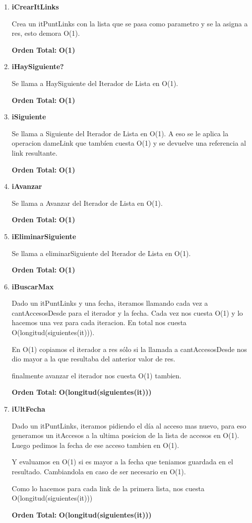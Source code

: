 \vspace*{1em}
\begin{enumerate}

\item\textbf{iCrearItLinks}
\par Crea un itPuntLinks con la lista que se pasa como parametro y se la asigna a res, esto demora O(1).
\par \textbf{Orden Total:} \textbf{O(1)}

\item\textbf{iHaySiguiente?}
\par Se llama a HaySiguiente del Iterador de Lista en O(1).
\par \textbf{Orden Total:} \textbf{O(1)}

\item\textbf{iSiguiente}
\par Se llama a Siguiente del Iterador de Lista en O(1). A eso se le aplica la operacion dameLink que tambíen cuesta O(1) y se devuelve una referencia al link resultante.
\par \textbf{Orden Total:} \textbf{O(1)}

\item\textbf{iAvanzar}
\par Se llama a Avanzar del Iterador de Lista en O(1).
\par \textbf{Orden Total:} \textbf{O(1)}

\item\textbf{iEliminarSiguiente}
\par Se llama a eliminarSiguiente del Iterador de Lista en O(1).
\par \textbf{Orden Total:} \textbf{O(1)}

\item\textbf{iBuscarMax}
\par Dado un itPuntLinks y una fecha, iteramos llamando cada vez a cantAccesosDesde para el iterador y la fecha. Cada vez nos cuesta O(1) y lo hacemos una vez para cada iteracion. En total nos cuesta O(longitud(siguientes(it))).
\par En O(1) copiamos el iterador a res sólo si la llamada a cantAccesosDesde nos dio mayor a la que resultaba del anterior valor de res.
\par finalmente avanzar el iterador nos cuesta O(1) tambien.
\par \textbf{Orden Total:} \textbf{O(longitud(siguientes(it)))}

\item\textbf{iUltFecha}
\par Dado un itPuntLinks, iteramos pidiendo el día al acceso mas nuevo, para eso generamos un itAccesos a la ultima posicion de la lista de accesos en O(1). Luego pedimos la fecha de ese acceso tambien en O(1).
\par Y evaluamos en O(1) si es mayor a la fecha que teniamos guardada en el resultado. Cambiandola en caso de ser necesario en O(1).
\par Como lo hacemos para cada link de la primera lista, nos cuesta O(longitud(siguientes(it)))
\par \textbf{Orden Total:} \textbf{O(longitud(siguientes(it)))}


\end{enumerate}

